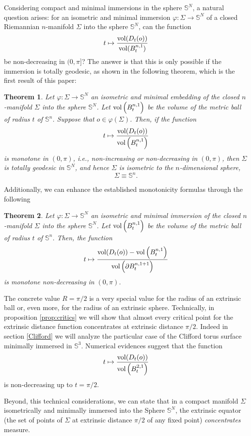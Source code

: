 \documentclass{amsart}
\newtheorem{theorem}{Theorem}[section]
\theoremstyle{definition}
\theoremstyle{remark}
\begin{document}
Considering compact and minimal immersions in the sphere $\mathbb{S}^N$, a natural question arises: for an isometric and minimal immersion $\varphi: \Sigma \to \mathbb{S}^N$ of a closed Riemannian $n$-manifold $\Sigma$ into the sphere $\mathbb{S}^N$, can the function
$$t\mapsto \frac{{\rm vol}(D_t(o))}{{\rm vol}( B_t^{n,1})}$$
be non-decreasing in $(0,\pi]$? The answer is that this is only possible if the immersion is totally geodesic, as shown in the following theorem, which is the first result of this paper:
\begin{theorem}\label{teounua}
Let $\varphi:\Sigma\to\mathbb{S}^N$ an isometric and minimal embedding of the closed $n$-manifold $\Sigma$ into the sphere $\mathbb{S}^N$.  Let ${\rm vol}\left(B^{n,1}_t\right)$ be the volume of the metric ball of radius $t$ of $\mathbb{S}^n$.
 Suppose that $o\in \varphi(\Sigma)$.  Then, if the function
 $$
 t\mapsto \frac{{\rm vol}(D_t(o))}{{\rm vol}\left(B^{n,1}_t\right)}
 $$
 is monotone in $(0,\pi)$, \emph{i.e.}, non-increasing or non-decreasing in $(0,\pi)$, then $\Sigma$ is totally geodesic in $\mathbb{S}^N$, and hence $\Sigma$ is isometric to the $n$-dimensional sphere, $$\Sigma\equiv \mathbb{S}^n.$$
\end{theorem}
Additionally, we can enhance the established monotonicity formulas through the following 
\begin{theorem}\label{teodua}
Let $\varphi:\Sigma\to\mathbb{S}^N$ an isometric and minimal immersion of the closed $n$-manifold $\Sigma$ into the sphere $\mathbb{S}^N$.  Let ${\rm vol}\left(B^{n,1}_t\right)$ be the volume of the metric ball of radius $t$ of $\mathbb{S}^n$. Then, the function
 $$
 t\mapsto \frac{{\rm vol}(D_t(o))-{\rm vol}\left(B^{n,1}_t\right)}{{\rm vol}\left( \partial B^{n,1+1}_t\right)}
 $$
 is monotone non-decreasing in $(0,\pi)$.
\end{theorem}

 
The concrete value $R=\pi/2$ is a very special value for the radius of an extrinsic ball or, even more, for the radius of an extrinsic sphere.  Technically, in proposition \ref{prop:critics} we will show that almost every critical point for the extrinsic distance function concentrates at extrinsic distance $\pi/2$. Indeed in section \ref{Clifford} we will analyze the particular case of the Clifford torus surface minimally immersed in $\mathbb{S}^3$. Numerical evidences suggest that the function 
$$
t\mapsto \frac{{\rm vol}(D_t(o))}{{\rm vol}\left(B^{2,1}_t\right)}
$$
is non-decreasing up to $t=\pi/2$.

Beyond, this technical considerations,  we can state that in a compact manifold $\Sigma$ isometrically and minimally immersed into the Sphere $\mathbb{S}^N$, the extrinsic equator (the set of points of $\Sigma$ at extrinsic distance $\pi/2$ of any fixed point) \emph{concentrates} measure.
\end{document}
